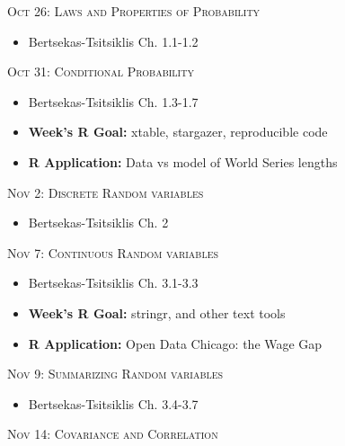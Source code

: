 \documentclass[11pt]{article}
\begin{document}
\newpage

\noindent \textsc{Oct 26: Laws and Properties of Probability}

\begin{itemize}

\item Bertsekas-Tsitsiklis Ch. 1.1-1.2 


\end{itemize}

\noindent \textsc{Oct 31: Conditional Probability}

\begin{itemize}

\item Bertsekas-Tsitsiklis Ch. 1.3-1.7

\item  {\bf Week's R Goal:} xtable, stargazer, reproducible code
 \item  {\bf R Application:} Data vs model of World Series lengths 

\end{itemize}

\noindent \textsc{Nov 2: Discrete Random variables }

\begin{itemize}

 \item Bertsekas-Tsitsiklis Ch. 2  
 


\end{itemize}


\noindent \textsc{Nov 7: Continuous Random variables}

\begin{itemize}
\item Bertsekas-Tsitsiklis Ch. 3.1-3.3 

 \item  {\bf Week's R Goal:} stringr, and other text tools
 \item  {\bf R Application:}  Open Data Chicago: the Wage Gap
\end{itemize}


\noindent \textsc{Nov 9: Summarizing Random variables}

\begin{itemize}
\item Bertsekas-Tsitsiklis Ch. 3.4-3.7 

\end{itemize}

\noindent \textsc{Nov 14: Covariance and Correlation}
\end{document}
